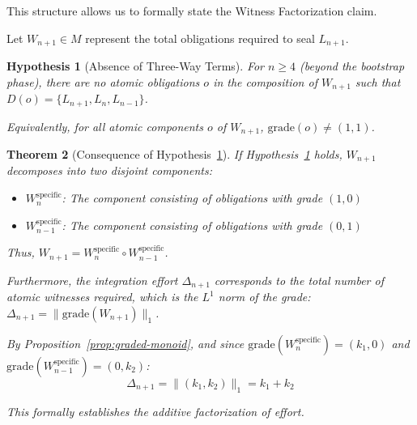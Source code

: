 \documentclass[11pt]{article}
\newtheorem{theorem}{Theorem}[section]
\newtheorem{hypothesis}[theorem]{Hypothesis}
\theoremstyle{definition}
\theoremstyle{remark}
\begin{document}
This structure allows us to formally state the Witness Factorization claim.

Let $W_{n+1} \in M$ represent the total obligations required to seal $L_{n+1}$.

\begin{hypothesis}[Absence of Three-Way Terms]
\label{hyp:no-three-way}
For $n \geq 4$ (beyond the bootstrap phase), there are no atomic obligations $o$ in the composition
of $W_{n+1}$ such that $D(o) = \{L_{n+1}, L_n, L_{n-1}\}$.

Equivalently, for all atomic components $o$ of $W_{n+1}$, $\text{grade}(o) \neq (1, 1)$.
\end{hypothesis}

\begin{theorem}[Consequence of Hypothesis~\ref{hyp:no-three-way}]
\label{thm:factorization-consequence}
If Hypothesis~\ref{hyp:no-three-way} holds, $W_{n+1}$ decomposes into two disjoint components:
\begin{itemize}
\item $W_n^{\text{specific}}$: The component consisting of obligations with grade $(1, 0)$
\item $W_{n-1}^{\text{specific}}$: The component consisting of obligations with grade $(0, 1)$
\end{itemize}

Thus, $W_{n+1} = W_n^{\text{specific}} \circ W_{n-1}^{\text{specific}}$.

Furthermore, the integration effort $\Delta_{n+1}$ corresponds to the total number of atomic witnesses
required, which is the $L^1$ norm of the grade: $\Delta_{n+1} = \|\text{grade}(W_{n+1})\|_1$.

By Proposition~\ref{prop:graded-monoid}, and since $\text{grade}(W_n^{\text{specific}}) = (k_1, 0)$ and
$\text{grade}(W_{n-1}^{\text{specific}}) = (0, k_2)$:
\[
\Delta_{n+1} = \|(k_1, k_2)\|_1 = k_1 + k_2
\]

This formally establishes the additive factorization of effort.
\end{theorem}
\end{document}
